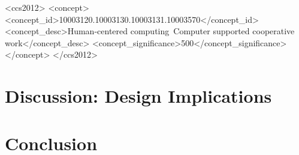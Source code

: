 \documentclass[acmsmall]{acmart}
\begin{document}
%
%

 \begin{CCSXML}
<ccs2012>
<concept>
<concept_id>10003120.10003130.10003131.10003570</concept_id>
<concept_desc>Human-centered computing~Computer supported cooperative work</concept_desc>
<concept_significance>500</concept_significance>
</concept>
</ccs2012>
\end{CCSXML}


%

%

%
\maketitle





\section{Discussion: Design Implications}
\section{Conclusion}




\end{document}
